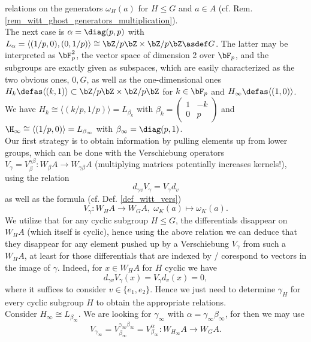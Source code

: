 relations on the generators $\omega_H (a)$ for $H \leq G$ and $a \in A$ (cf.
Rem. \ref{rem_witt_ghost_generators_multiplication}).\\
The next case is $\alpha = \diag(p,p)$ with $L_\alpha = \langle (1/p,0), (0,1/p)
\rangle \cong \bZ/p\bZ \times \bZ/p\bZ \asdef G$. The latter may be interpreted
as $\bF_p^2$, the vector space of dimension 2 over $\bF_p$, and the subgroups
are exactly given as subspaces, which are easily characterized as the two
obvious ones, $0, G$, as well as the one-dimensional ones $H_k \defas \langle
(k,1) \rangle \subset \bZ/p\bZ \times \bZ/p\bZ$ for $k \in \bF_p$ and $H_\infty
\defas \langle (1,0) \rangle$. We have $H_k \cong \langle (k/p,1/p) \rangle =
L_{\beta_k}$ with %
$\beta_k = \left( \begin{smallmatrix} 1 & -k \\ 0 & p \end{smallmatrix} \right)$
	and $\H_\infty \cong \langle (1/p,0) \rangle = L_{\beta_\infty}$ with
	$\beta_\infty = \diag(p,1)$.\\
Our first strategy is to obtain information by pulling elements up from lower
groups, which can be done with the Verschiebung operators $V_\gamma =
V_{\beta}^{\gamma\beta}: W_\beta A \to W_{\gamma\beta} A$ (multiplying matrices
potentially increases kernels!), using the relation%
\[d_{\gamma v} V_\gamma = V_\gamma d_v\]%
as well as the formula (cf. Def. \ref{def_witt_vers})
\[ V_\gamma: W_H A \to W_G A, \; \omega_K (a) \mapsto \omega_K (a). \]
We utilize that for any cyclic subgroup $H \leq G$, the differentials disappear
on $W_H A$ (which itself is cyclic), hence using the above relation we can
deduce that they disappear for any element pushed up by a Verschiebung
$V_\gamma$ from such a $W_H A$, at least for those differentials that are
indexed by / corespond to vectors in the image of $\gamma$. Indeed, for $x \in
W_H A$ for $H$ cyclic we have
\begin{equation*}
	d_{\gamma v} V_\gamma (x) = V_\gamma d_v (x) = 0,
\end{equation*}
where it suffices to consider $v \in \{e_1,e_2\}$. Hence we just need to
determine $\gamma_H$ for every cyclic subgroup $H$ to obtain the appropriate
relations.\\
Consider $H_\infty \cong L_{\beta_\infty}$. We are looking for $\gamma_\infty$
with $\alpha = \gamma_\infty\beta_\infty$, for then we may use
\begin{equation*}
	V_{\gamma_\infty} = V_{\beta_\infty}^{\gamma_\infty\beta_\infty} = %
	V_{\beta_\infty}^{\alpha}: W_{H_\infty} A \to W_G A.
\end{equation*}
